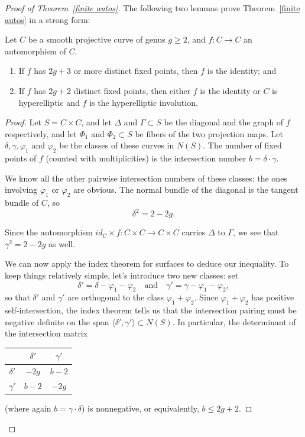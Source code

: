 \begin{proof}[Proof of Theorem~\ref{finite autos}]
 
The following two lemmas prove Theorem~\ref{finite autos} in a strong form:

\begin{lemma}Let $C$ be a smooth projective curve of genus $g \geq 2$, and $f: C \to C$ an automorphism of $C$.
\begin{enumerate}
\item If $f$ has $2g+3$ or more distinct fixed points, then $f$ is the identity; and
\item If $f$ has $2g+2$ distinct fixed points, then either $f$ is the identity or $C$ is hyperelliptic and $f$ is the hyperelliptic involution.
\end{enumerate}
\end{lemma}

\begin{proof}
Let $S = C\times C$, and let $\Delta$ and $\Gamma \subset S$ be the diagonal and the graph of $f$ respectively, and let $\Phi_1$ and $\Phi_2 \subset S$ be fibers of the two projection maps. Let $\delta, \gamma, \varphi_1$ and $\varphi_2$ be the classes of these curves in  $N(S)$. The number of fixed points of $f$ (counted with multiplicities) is the intersection number  $b = \delta \cdot \gamma$.

We know all the other pairwise intersection numbers of these classes: the ones involving $\varphi_1$ or $\varphi_2$ are obvious. The normal bundle of the diagonal is the tangent bundle of $C$, so
$$
\delta^2 = 2 - 2g.
$$


Since the automorphism $id_C \times f : C\times C \to C \times C$ carries $\Delta$ to $\Gamma$, we see that $\gamma^2 = 2-2g$ as well.

We can now apply the index theorem for surfaces to deduce our inequality. To keep things relatively simple, let's introduce two new classes: set
$$
\delta' = \delta - \varphi_1 - \varphi_2 \quad \text{and} \quad \gamma' = \gamma - \varphi_1 - \varphi_2,
$$
so that $\delta'$ and $\gamma'$ are orthogonal to the class $\varphi_1 + \varphi_2$. Since $\varphi_1 + \varphi_2$ has positive self-intersection, the index theorem  tells us that the intersection pairing must be negative definite on the span $\langle \delta',\gamma' \rangle \subset N(S)$. In particular, the determinant of the intersection matrix
\begin{center}
\begin{tabular}{c|c|c}
& $\delta'$ &  $\gamma'$  \\
\hline
$\delta'$ & $-2g$ & $b-2$ \\
\hline
$\gamma'$ & $b-2$ & $-2g$ 
\end{tabular}
\end{center}
(where again $b = \gamma \cdot \delta$) is nonnegative, or equivalently, $b\leq 2g+2$.
\end{proof}


\end{proof}

